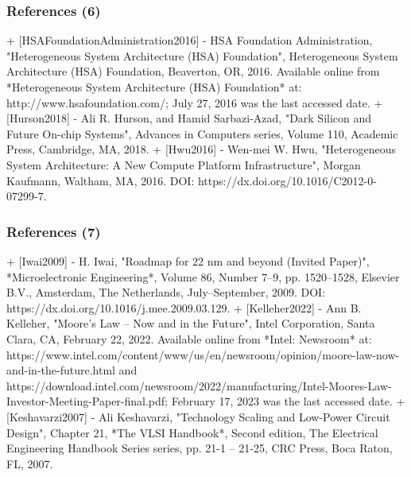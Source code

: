 \documentclass[xcolor={usenames,dvipsnames},hyperref={hyperindex,bookmarks}]{beamer}
\begin{document}
\begin{frame}
	\frametitle{References (6)}



+ [HSAFoundationAdministration2016]
	- {HSA Foundation Administration}, "Heterogeneous System Architecture (HSA) Foundation", Heterogeneous System Architecture (HSA) Foundation, Beaverton, {OR}, 2016. Available online from *Heterogeneous System Architecture (HSA) Foundation* at: http://www.hsafoundation.com/; July 27, 2016 was the last accessed date.
+ [Hurson2018]
	- Ali R. Hurson, and Hamid {Sarbazi-Azad}, "Dark Silicon and Future On-chip Systems", Advances in Computers series, Volume 110, Academic Press, Cambridge, {MA}, 2018.
+ [Hwu2016]
	- {Wen-mei} W. Hwu, "Heterogeneous System Architecture: A New Compute Platform Infrastructure", Morgan Kaufmann, Waltham, {MA}, 2016. DOI: https://dx.doi.org/10.1016/C2012-0-07299-7.


\end{frame}
















\begin{frame}
	\frametitle{References (7)}


+ [Iwai2009]
	- H. Iwai, "Roadmap for 22 nm and beyond (Invited Paper)", *Microelectronic Engineering*, Volume 86, Number 7--9, pp. 1520--1528, Elsevier {B.V.}, Amsterdam, {The Netherlands}, July--September, 2009. DOI: https://dx.doi.org/10.1016/j.mee.2009.03.129.
+ [Kelleher2022]
	- Ann B. Kelleher, "Moore's Law -- Now and in the Future", Intel Corporation, Santa Clara, {CA}, February 22, 2022. Available online from *Intel: Newsroom* at: https://www.intel.com/content/www/us/en/newsroom/opinion/moore-law-now-and-in-the-future.html and https://download.intel.com/newsroom/2022/manufacturing/Intel-Moores-Law-Investor-Meeting-Paper-final.pdf; February 17, 2023 was the last accessed date.
+ [Keshavarzi2007]
	- Ali Keshavarzi, "Technology Scaling and Low-Power Circuit Design", Chapter 21, *The {VLSI} Handbook*, Second edition, The Electrical Engineering Handbook Series series, pp. 21-1 -- 21-25, {CRC} Press, Boca Raton, {FL}, 2007.




\end{frame}
\end{document}
